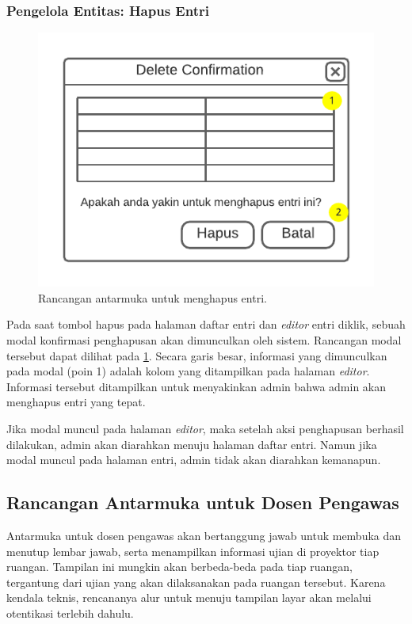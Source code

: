     
\subsubsection{Pengelola Entitas: Hapus Entri}
    \begin{figure}
        \centering
        \includegraphics{Gambar/mockups/Mockup--Admin - Entity Delete.pdf}
        \caption{Rancangan antarmuka untuk menghapus entri.}
        \label{fig:mockup_admin_entity_delete}
    \end{figure}
    Pada saat tombol hapus pada halaman daftar entri dan \textit{editor} entri diklik, sebuah modal konfirmasi
    penghapusan akan dimunculkan oleh sistem. Rancangan modal tersebut dapat dilihat pada
    \ref{fig:mockup_admin_entity_delete}. Secara garis besar, informasi yang dimunculkan pada modal
    (poin 1) adalah kolom yang ditampilkan pada halaman \textit{editor}. Informasi tersebut ditampilkan 
    untuk menyakinkan admin bahwa admin akan menghapus entri yang tepat.
    
    Jika modal muncul pada halaman \textit{editor}, maka setelah aksi penghapusan berhasil dilakukan,
    admin akan diarahkan menuju halaman daftar entri. Namun jika modal muncul pada halaman entri,
    admin tidak akan diarahkan kemanapun.
    
\subsection{Rancangan Antarmuka untuk Dosen Pengawas}
    Antarmuka untuk dosen pengawas akan bertanggung jawab untuk membuka dan menutup lembar jawab,
    serta menampilkan informasi ujian di proyektor tiap ruangan. Tampilan ini mungkin akan 
    berbeda-beda pada tiap ruangan, tergantung dari ujian yang akan dilaksanakan pada ruangan
    tersebut. Karena kendala teknis, rencananya alur untuk menuju tampilan layar akan melalui otentikasi
    terlebih dahulu. 
    
